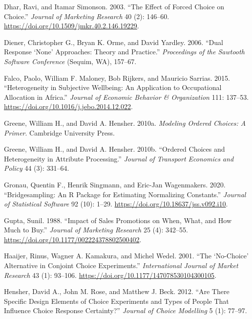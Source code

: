 \documentclass[
  letterpaper,
  DIV=11,
  numbers=noendperiod]{scrartcl}
\newlength{\cslhangindent}
\newenvironment{CSLReferences}[2] %
 {\begin{list}{}{%
  \setlength{\itemindent}{0pt}
  \setlength{\leftmargin}{0pt}
  \setlength{\parsep}{0pt}
  \ifodd #1
   \setlength{\leftmargin}{\cslhangindent}
   \setlength{\itemindent}{-1\cslhangindent}
  \fi
  \setlength{\itemsep}{#2\baselineskip}}}
 {\end{list}}
\theoremstyle{plain}
\theoremstyle{plain}
\theoremstyle{plain}
\theoremstyle{remark}
\begin{document}
\begin{CSLReferences}{1}{1}
Dhar, Ravi, and Itamar Simonson. 2003. {``The Effect of Forced Choice on
Choice.''} \emph{Journal of Marketing Research} 40 (2): 146--60.
\url{https://doi.org/10.1509/jmkr.40.2.146.19229}.

Diener, Christopher G., Bryan K. Orme, and David Yardley. 2006. {``Dual
Response {`None'} Approaches: Theory and Practice.''} \emph{Proceedings
of the Sawtooth Software Conference} (Sequim, WA), 157--67.

Falco, Paolo, William F. Maloney, Bob Rijkers, and Mauricio Sarrias.
2015. {``Heterogeneity in Subjective Wellbeing: An Application to
Occupational Allocation in {Africa}.''} \emph{Journal of Economic
Behavior \& Organization} 111: 137--53.
\url{https://doi.org/10.1016/j.jebo.2014.12.022}.

Greene, William H., and David A. Hensher. 2010a. \emph{Modeling Ordered
Choices: A Primer}. Cambridge University Press.

Greene, William H., and David A. Hensher. 2010b. {``Ordered Choices and
Heterogeneity in Attribute Processing.''} \emph{Journal of Transport
Economics and Policy} 44 (3): 331--64.

Gronau, Quentin F., Henrik Singmann, and Eric-Jan Wagenmakers. 2020.
{``Bridgesampling: An {R} Package for Estimating Normalizing
Constants.''} \emph{Journal of Statistical Software} 92 (10): 1--29.
\url{https://doi.org/10.18637/jss.v092.i10}.

Gupta, Sunil. 1988. {``Impact of Sales Promotions on When, What, and How
Much to Buy.''} \emph{Journal of Marketing Research} 25 (4): 342--55.
\url{https://doi.org/10.1177/002224378802500402}.

Haaijer, Rinus, Wagner A. Kamakura, and Michel Wedel. 2001. {``The
{`No-Choice'} Alternative in Conjoint Choice Experiments.''}
\emph{International Journal of Market Research} 43 (1): 93--106.
\url{https://doi.org/10.1177/147078530104300105}.

Hensher, David A., John M. Rose, and Matthew J. Beck. 2012. {``Are There
Specific Design Elements of Choice Experiments and Types of People That
Influence Choice Response Certainty?''} \emph{Journal of Choice
Modelling} 5 (1): 77--97.


\end{CSLReferences}
\end{document}
